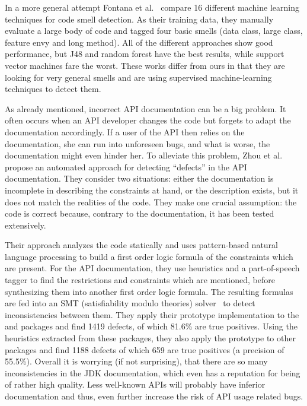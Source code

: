 In a more general attempt Fontana et al.~\cite{fontana2013code}\cite{fontana2016comparing} compare 16 different machine learning techniques for code smell detection.
As their training data, they manually evaluate a large body of code and tagged four basic smells (data class, large class, feature envy and long method).
All of the different approaches show good performance, but J48 and random forest have the best results, while support vector machines fare the worst.
These works differ from ours in that they are looking for very general smells and are using supervised machine-learning techniques to detect them.

As already mentioned, incorrect API documentation can be a big problem.
It often occurs when an API developer changes the code but forgets to adapt the documentation accordingly.
If a user of the API then relies on the documentation, she can run into unforeseen bugs, and what is worse, the documentation might even hinder her.
To alleviate this problem, Zhou et al.~\cite{zhou2017analyzing} propose an automated approach for detecting ``defects'' in the API documentation.
They consider two situations: either the documentation is incomplete in describing the constraints at hand, or the description exists, but it does not match the realities of the code.
They make one crucial assumption: the code is correct because, contrary to the documentation, it has been tested extensively.

Their approach analyzes the code statically and uses pattern-based natural language processing to build a first order logic formula of the constraints which are present.
For the API documentation, they use heuristics and a part-of-speech tagger to find the restrictions and constraints which are mentioned, before synthesizing them into another first order logic formula.
The resulting formulas are fed into an SMT (satisfiability modulo theories) solver~\cite{barrett2009satisfiability} to detect inconsistencies between them.
They apply their prototype implementation to the  and  packages and find 1419 defects, of which 81.6\% are true positives.
Using the heuristics extracted from these packages, they also apply the prototype to other packages and find 1188 defects of which 659 are true positives (a precision of 55.5\%).
Overall it is worrying (if not surprising), that there are so many inconsistencies in the JDK documentation, which even has a reputation for being of rather high quality.
Less well-known APIs will probably have inferior documentation and thus, even further increase the risk of API usage related bugs.

